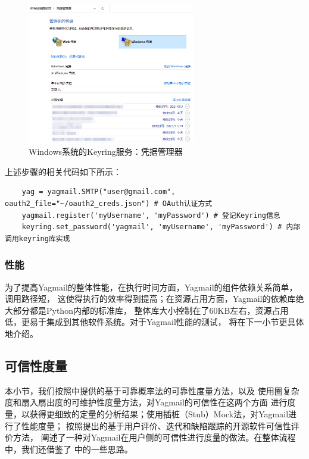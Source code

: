\documentclass[UTF8,12pt,a4paper]{ctexart}
\begin{document}
    \begin{figure}[H]
        \centering
        \includegraphics[width=0.65\textwidth]{figure/windows-keyring.png}
        \caption{Windows系统的Keyring服务：凭据管理器}
        \label{fig:windows-keyring}
    \end{figure}
    
    上述步骤的相关代码如下所示：
    \begin{lstlisting}
    yag = yagmail.SMTP("user@gmail.com", oauth2_file="~/oauth2_creds.json") # OAuth认证方式
    yagmail.register('myUsername', 'myPassword') # 登记Keyring信息
    keyring.set_password('yagmail', 'myUsername', 'myPassword') # 内部调用keyring库实现
    \end{lstlisting}
    
    \subsubsection{性能}
    
    为了提高Yagmail的整体性能，在执行时间方面，Yagmail的组件依赖关系简单，调用路径短，
    这使得执行的效率得到提高；在资源占用方面，Yagmail的依赖库绝大部分都是Python内部的标准库，
    整体库大小控制在了60KB左右，资源占用低，更易于集成到其他软件系统。对于Yagmail性能的测试，
    将在下一小节更具体地介绍。

\subsection{可信性度量}

    本小节，我们按照\cite{thebook}中提供的基于可靠概率法的可靠性度量方法，以及
    使用圈复杂度和扇入扇出度的可维护性度量方法，对Yagmail的可信性在这两个方面
    进行度量，以获得更细致的定量的分析结果；使用插桩（Stub）Mock法，对Yagmail进行了性能度量；
    按照\cite{opensource}提出的基于用户评价、迭代和缺陷跟踪的开源软件可信性评价方法，
    阐述了一种对Yagmail在用户侧的可信性进行度量的做法。在整体流程中，我们还借鉴了
    \cite{misc1}\cite{misc2}中的一些思路。
\end{document}
